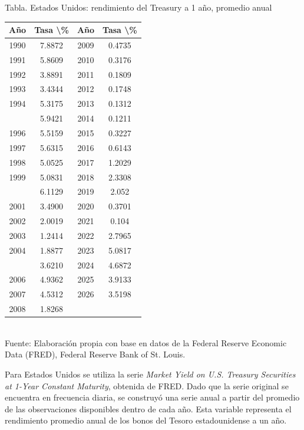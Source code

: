 \documentclass{article}\usepackage[]{graphicx}\usepackage[]{xcolor}
\begin{document}
\begin{center}
Tabla. Estados Unidos: rendimiento del Treasury a 1 año, promedio anual
\end{center}
\begin{center}

\begin{tabular}{cccc}
\toprule
Año & Tasa \textbackslash{}\% & Año & Tasa \textbackslash{}\%\\
\midrule
1990 & 7.8872 & 2009 & 0.4735\\
1991 & 5.8609 & 2010 & 0.3176\\
1992 & 3.8891 & 2011 & 0.1809\\
1993 & 3.4344 & 2012 & 0.1748\\
1994 & 5.3175 & 2013 & 0.1312\\
\addlinespace
1995 & 5.9421 & 2014 & 0.1211\\
1996 & 5.5159 & 2015 & 0.3227\\
1997 & 5.6315 & 2016 & 0.6143\\
1998 & 5.0525 & 2017 & 1.2029\\
1999 & 5.0831 & 2018 & 2.3308\\
\addlinespace
2000 & 6.1129 & 2019 & 2.052\\
2001 & 3.4900 & 2020 & 0.3701\\
2002 & 2.0019 & 2021 & 0.104\\
2003 & 1.2414 & 2022 & 2.7965\\
2004 & 1.8877 & 2023 & 5.0817\\
\addlinespace
2005 & 3.6210 & 2024 & 4.6872\\
2006 & 4.9362 & 2025 & 3.9133\\
2007 & 4.5312 & 2026 & 3.5198\\
2008 & 1.8268 &  & \\
\bottomrule
\end{tabular}
\\[0.3em]
{\footnotesize Fuente: Elaboración propia con base en datos de la Federal Reserve Economic Data (FRED), Federal Reserve Bank of St. Louis.}
\end{center}


Para Estados Unidos se utiliza la serie \textit{Market Yield on U.S. Treasury Securities at 1-Year Constant Maturity}, obtenida de FRED. Dado que la serie original se encuentra en frecuencia diaria, se construyó una serie anual a partir del promedio de las observaciones disponibles dentro de cada año. Esta variable representa el rendimiento promedio anual de los bonos del Tesoro estadounidense a un año.
\end{document}
